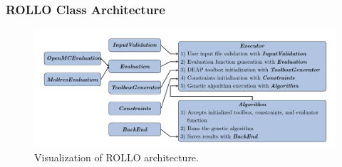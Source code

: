 \begin{frame}
    \frametitle{ROLLO Class Architecture}
    \begin{figure}
        \centering
        \includegraphics[width=1.1\linewidth]{figures/rollo-architecture.png} 
        \caption{Visualization of ROLLO architecture.}
    \end{figure}
\end{frame}